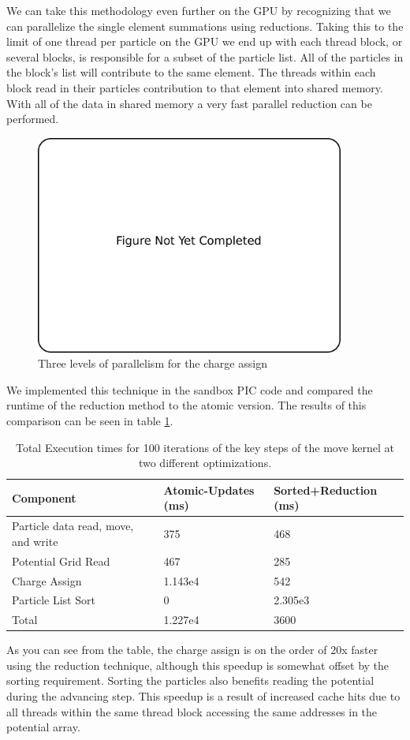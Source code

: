 We can take this methodology even further on the GPU by recognizing that we can parallelize the single element summations using reductions. Taking this to the limit of one thread per particle on the GPU we end up with each thread block, or several blocks, is responsible for a subset of the particle list. All of the particles in the block's list will contribute to the same element. The threads within each block read in their particles contribution to that element into shared memory. With all of the data in shared memory a very fast parallel reduction can be performed. 

\begin{figure}
\begin{center}
\includegraphics[width=4in]{introduction/not_finished.pdf}
\end{center}
\caption{Three levels of parallelism for the charge assign}
\label{fig:pic_flowchart_parallel}
\end{figure}

We implemented this technique in the sandbox PIC code and compared the runtime of the reduction method to the atomic version. The results of this comparison can be seen in table \ref{tab:GPUPIC_comparison}.

\noindent \begin{table}
\begin{tabular}{| p{4.0cm} | p{3.5cm} | p{3.5cm} |}
\hline
Component & Atomic-Updates (ms) & Sorted+Reduction (ms) \\ \hline
Particle data read, move, and write & 375 & 468 \\ \hline
Potential Grid Read & 467 & 285 \\ \hline
Charge Assign & 1.143e4 & 542 \\ \hline
Particle List Sort & 0 & 2.305e3 \\ \hline
Total & 1.227e4 & 3600 \\ \hline
\end{tabular}
\caption{Total Execution times for 100 iterations of the key steps of the move kernel at two different optimizations.}
\label{tab:GPUPIC_comparison}
\end{table}
As you can see from the table, the charge assign is on the order of 20x faster using the reduction technique, although this speedup is somewhat offset by the sorting requirement. Sorting the particles also benefits reading the potential during the advancing step. This speedup is a result of increased cache hits due to all threads within the same thread block accessing the same addresses in the potential array. 

